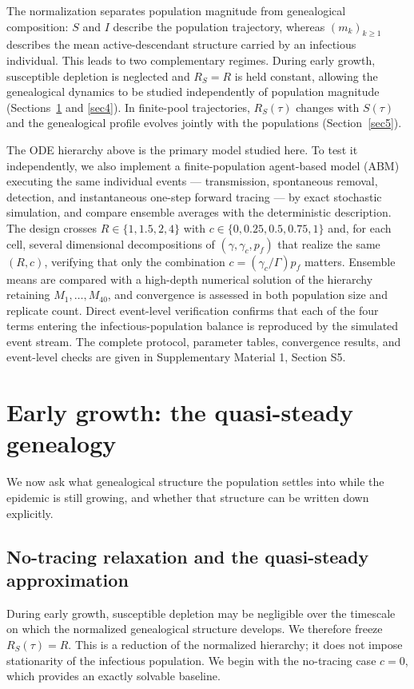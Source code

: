 \documentclass[review,12pt]{elsarticle}
\numberwithin{equation}{section}
\theoremstyle{remark}
\begin{document}
The normalization separates population magnitude from genealogical composition: $S$ and $I$ describe the population trajectory, whereas $(m_k)_{k\geq1}$ describes the mean active-descendant structure carried by an infectious individual. This leads to two complementary regimes. During early growth, susceptible depletion is neglected and $R_S=R$ is held constant, allowing the genealogical dynamics to be studied independently of population magnitude (Sections~\ref{sec3} and \ref{sec4}). In finite-pool trajectories, $R_S(\tau)$ changes with $S(\tau)$ and the genealogical profile evolves jointly with the populations (Section~\ref{sec5}).

The ODE hierarchy above is the primary model studied here. To test it independently, we also implement a finite-population agent-based model (ABM) executing the same individual events --- transmission, spontaneous removal, detection, and instantaneous one-step forward tracing --- by exact stochastic simulation, and compare ensemble averages with the deterministic description. The design crosses $R\in\{1,1.5,2,4\}$ with $c\in\{0,0.25,0.5,0.75,1\}$ and, for each cell, several dimensional decompositions of $(\gamma,\gamma_c,p_f)$ that realize the same $(R,c)$, verifying that only the combination $c=(\gamma_c/\Gamma)p_f$ matters. Ensemble means are compared with a high-depth numerical solution of the hierarchy retaining $M_1,\ldots,M_{40}$, and convergence is assessed in both population size and replicate count. Direct event-level verification confirms that each of the four terms entering the infectious-population balance is reproduced by the simulated event stream. The complete protocol, parameter tables, convergence results, and event-level checks are given in Supplementary Material 1, Section S5.

\section{Early growth: the quasi-steady genealogy}\label{sec3}

We now ask what genealogical structure the population settles into while the epidemic is still growing, and whether that structure can be written down explicitly.

\subsection{No-tracing relaxation and the quasi-steady approximation}\label{subsec3.1}

During early growth, susceptible depletion may be negligible over the timescale on which the normalized genealogical structure develops. We therefore freeze $R_S(\tau)=R$. This is a reduction of the normalized hierarchy; it does not impose stationarity of the infectious population. We begin with the no-tracing case $c=0$, which provides an exactly solvable baseline.
\end{document}
